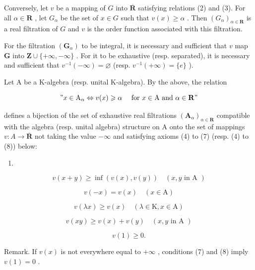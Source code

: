 Conversely, let \(v\) be a mapping of \(G\) into \(\overline{\mathbf{R}}\) satisfying relations (2) and (3). For all \(\alpha \in \mathbf{R}\) , let \(G_{\alpha}\) be the set of \(x \in G\) such that \(v(x) \geqslant \alpha\) . Then \((G_{\alpha})_{\alpha \in \mathbf{R}}\) is a real filtration of \(G\) and \(v\) is the order function associated with this filtration.

For the filtration \((\mathbf{G}_{\alpha})\) to be integral, it is necessary and sufficient that \(v\) map \(\mathbf{G}\) into \(\mathbf{Z} \cup \{+\infty, -\infty\}\) . For it to be exhaustive (resp. separated), it is necessary and sufficient that \(v^{-1}(-\infty) = \varnothing\) (resp. \(v^{-1}(+\infty) = \{e\}\) ).

Let A be a K-algebra (resp. unital K-algebra). By the above, the relation

\[
" x \in \mathrm{A} _ {\alpha} \Leftrightarrow v (x) \geqslant \alpha \quad \text { for } x \in \mathrm{A} \text { and } \alpha \in \mathbf {R}"
\]

defines a bijection of the set of exhaustive real filtrations \((\mathbf{A}_{\alpha})_{\alpha\in\mathbf{R}}\) compatible with the algebra (resp. unital algebra) structure on A onto the set of mappings \(v: A \to \overline{\mathbf{R}}\) not taking the value \(-\infty\) and satisfying axioms (4) to (7) (resp. (4) to (8)) below:

\begin{enumerate}
\def\labelenumi{(\arabic{enumi})}
\setcounter{enumi}{3}
\tightlist
\item
\end{enumerate}

\[
v (x + y) \geqslant \inf (v (x), v (y)) \quad (x, y \text {   in   A })\tag{5}
\]

\[
v (- x) = v (x) \quad (x \in \mathrm{A})\tag{6}
\]

\[
v (\lambda x) \geqslant v (x) \quad (\lambda \in \mathrm{K}, x \in \mathrm{A})\tag{7}
\]

\[
v (x y) \geqslant v (x) + v (y) \quad (x, y \text {   in   A })\tag{8}
\]

\[
v (1) \geqslant 0.
\]

Remark. If \(v(x)\) is not everywhere equal to \(+\infty\) , conditions (7) and (8) imply \(v(1) = 0\) .

